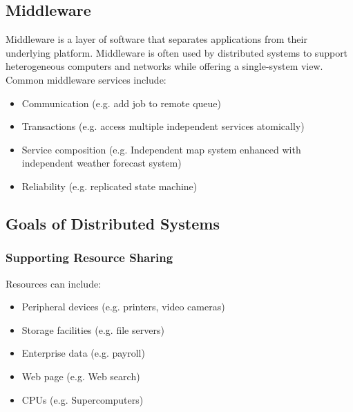 \documentclass[12pt,titlepage]{article}
\begin{document}
    \subsection{Middleware}
      Middleware is a layer of software that separates applications from their underlying platform. Middleware is often used by distributed
      systems to support heterogeneous computers and networks while offering a single-system view. Common middleware services include:
      \begin{itemize}
        \item Communication (e.g. add job to remote queue)
        \item Transactions (e.g. access multiple independent services atomically)
        \item Service composition (e.g. Independent map system enhanced with independent weather forecast system)
        \item Reliability (e.g. replicated state machine)
      \end{itemize}

    \subsection{Goals of Distributed Systems}
      \subsubsection{Supporting Resource Sharing}
        Resources can include:
        \begin{itemize}
          \item Peripheral devices (e.g. printers, video cameras)
          \item Storage facilities (e.g. file servers)
          \item Enterprise data (e.g. payroll)
          \item Web page (e.g. Web search)
          \item CPUs (e.g. Supercomputers)
        \end{itemize}
\end{document}
